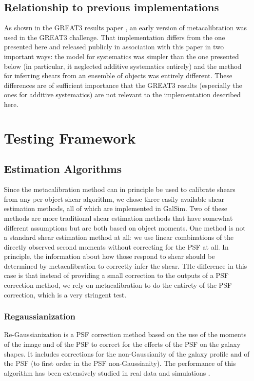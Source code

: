 \documentclass[iop]{emulateapj}
\begin{document}
\subsection{Relationship to previous implementations}

As shown in the GREAT3 results paper \citep{2015MNRAS.450.2963M}, an early version of
metacalibration was used in the GREAT3 challenge.  That implementation differs from the one
presented here and released publicly in association with this paper in two important ways: the model
for systematics was simpler than the one presented below (in particular, it neglected additive
systematics entirely) and the method for inferring shears from an ensemble of objects was entirely
different.  These differences are of sufficient importance that the GREAT3 results (especially the
ones for additive systematics) are not relevant to the implementation described here.


\section{Testing Framework}

\subsection{Estimation Algorithms}

Since the metacalibration method can in principle be used to calibrate shears from any per-object
shear algorithm, we chose three easily available shear estimation methods, all of which are
implemented in GalSim.  Two of these methods are more traditional shear estimation methods that have
somewhat different assumptions but are both based on object moments.  One method is not a standard
shear estimation method at all: we use linear combinations of the directly observed second moments
without correcting for the PSF at all.  In principle, the information about how those respond to
shear should be determined by metacalibration to correctly infer the shear.  THe difference in this
case is that instead of providing a small correction to the outputs of a PSF correction method, we
rely on metacalibration to do the entirety of the PSF correction, which is a very stringent test.

\subsubsection{Regaussianization}

 Re-Gaussianization \citep{2003MNRAS.343..459H} is a PSF correction method based on the use of the
 moments of the image and of the PSF to correct for the effects of the PSF on the galaxy shapes. It
 includes corrections for the non-Gaussianity of the galaxy profile
 \citep{2002AJ....123..583B,2003MNRAS.343..459H} and of the PSF (to first order in the PSF
 non-Gaussianity). The performance of this algorithm has been extensively studied in real data and
 simulations
 \citep[e.g.,][]{2005MNRAS.361.1287M,2012MNRAS.420.1518M,2013MNRAS.432.1544M,2015MNRAS.450.2963M}.
\end{document}
